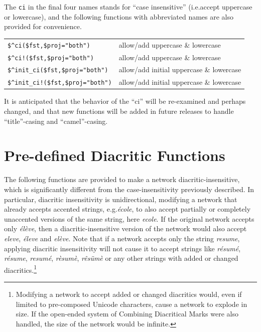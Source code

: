 \documentclass[letterpaper,12pt]{article}
\begin{document}
\vspace{0.5cm}

The \texttt{ci} in the final four names stands for ``case insensitive''
(i.e.\@ accept uppercase or lowercase), and the following functions with
abbreviated names are also provided for convenience.

\vspace{0.5cm}

\noindent
\begin{tabular}{|l|l|}
\hline
\verb/$^ci($fst,/\verb!$proj="both"!\verb!)! & allow/add uppercase \& lowercase\\
\verb/$^ci!($fst,/\verb!$proj="both"!\verb!)! & allow/add uppercase \& lowercase\\
\verb/$^init_ci($fst,/\verb!$proj="both"!\verb!)! & allow/add initial uppercase \& lowercase\\
\verb/$^init_ci!($fst,/\verb!$proj="both"!\verb!)! & allow/add initial uppercase \& lowercase\\
\hline
\end{tabular}

\vspace{0.5cm}

It is anticipated that the behavior of the ``ci'' will be re-examined and
perhaps changed, and that new functions will be added in future releases
to handle ``title''-casing and ``camel''-casing.

\newpage

\section{Pre-defined Diacritic Functions}

The following functions are provided to make a network
diacritic-insensitive, which is significantly different from the
case-insensitivity previously described.  In particular, diacritic
insensitivity is unidirectional, modifying a network that already accepts
accented strings, e.g.\@ \emph{\'ecole}, to also accept partially or
completely unaccented versions of the same string, here \emph{ecole}.  If
the original network accepts only \emph{\'el\`eve}, then a
diacritic-insensitive version of the network would also accept
\emph{eleve}, \emph{\'eleve} and \emph{el\`eve}.  Note that if a network
accepts only the string \emph{resume}, applying diacritic insensitivity
will not cause it to accept strings like \emph{r\'esum\'e},
\emph{r\'esume}, \emph{resum\'e}, \emph{r\`esum\`e}, \emph{r\^es\"um\`e}
or any other strings with added or changed diacritics.\footnote{Modifying
a network to accept added or changed diacritics would, even if limited to
pre-composed Unicode characters, cause a network to explode in size.  If
the open-ended system of Combining Diacritical Marks were also handled,
the size of the network would be infinite.}
\end{document}
